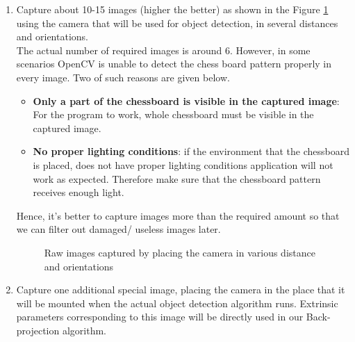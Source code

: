 \documentclass[a4paper,12pt]{report}
\begin{document}
\begin{appendices}
\begin{enumerate}
		\item Capture about 10-15 images (higher the better) as shown in the Figure \ref{fig:rawimages} using the camera that will be used for object detection, in several distances and orientations.\\
		
		The actual number of required images is around 6. However, in some scenarios OpenCV is unable to detect the chess board pattern properly in every image. Two of such reasons are given below.
		
		\begin{itemize}
			\item\textbf{Only a part of the chessboard is visible in the captured image}: For the program to work, whole chessboard must be visible in the captured image.
			
			\item \textbf{No proper lighting conditions}: if the environment that the  chessboard is placed, does not have proper lighting conditions application will not work as expected. Therefore make sure that the chessboard pattern receives enough light.
			
		\end{itemize}
		Hence, it's better to capture images more than the required amount so that we can filter out damaged/ useless images later. 
		
		\begin{figure}[h]
			\centering
			\caption{Raw images captured by placing the camera in various distance and orientations}
			\label{fig:rawimages}
		\end{figure}
		
		\item Capture one additional special image, placing the camera in the place that it will be mounted when the actual object detection algorithm runs. Extrinsic parameters\cite{hartley_zisserman_2004} corresponding to this image will be directly used in our Back-projection algorithm.\\
		

\end{enumerate}
\end{appendices}
\end{document}
